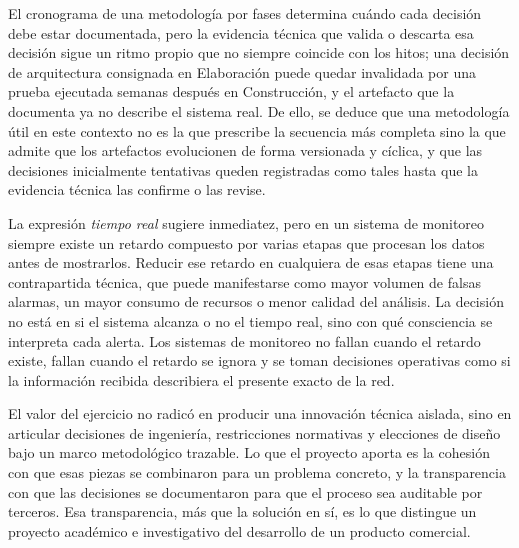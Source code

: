 El cronograma de una metodología por fases determina cuándo cada decisión 
debe estar documentada, pero la evidencia técnica que valida o 
descarta esa decisión sigue un ritmo propio que no siempre 
coincide con los hitos; una decisión de arquitectura consignada 
en Elaboración puede quedar invalidada por una prueba ejecutada 
semanas después en Construcción, y el artefacto que la documenta 
ya no describe el sistema real. De ello, se deduce que una
 metodología útil en este contexto no es la que prescribe la 
 secuencia más completa sino la que admite que los artefactos 
 evolucionen de forma versionada y cíclica, y que las decisiones 
 inicialmente tentativas queden registradas como tales hasta que 
 la evidencia técnica las confirme o las revise.

La expresión \textit{tiempo real} sugiere inmediatez, pero en un sistema 
de monitoreo siempre existe un retardo compuesto por varias etapas que 
procesan los datos antes de mostrarlos. Reducir ese retardo en cualquiera 
de esas etapas tiene una contrapartida técnica, que puede manifestarse 
como mayor volumen de falsas alarmas, un mayor consumo de recursos o 
menor calidad del análisis. La decisión no está en si el sistema alcanza 
o no el tiempo real, sino con qué consciencia se interpreta cada alerta. 
Los sistemas de monitoreo no fallan cuando el retardo existe, fallan 
cuando el retardo se ignora y se toman decisiones operativas como si la 
información recibida describiera el presente exacto de la red.

El valor del ejercicio no radicó en producir una innovación técnica 
aislada, sino en articular decisiones de ingeniería, restricciones 
normativas y elecciones de diseño bajo un marco metodológico trazable. 
Lo que el proyecto aporta es la cohesión con que esas piezas se 
combinaron para un problema concreto, y la transparencia con que las 
decisiones se documentaron para que el proceso sea auditable por 
terceros. Esa transparencia, más que la solución en sí, es lo que 
distingue un proyecto académico e investigativo del desarrollo de un 
producto comercial.